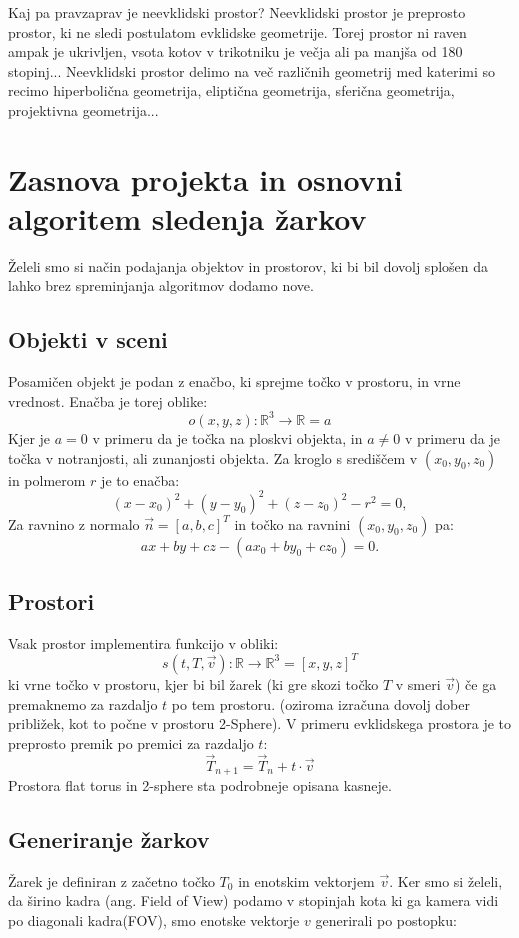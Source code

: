 \documentclass[titlepage]{article}
\begin{document}
Kaj pa pravzaprav je neevklidski prostor?
Neevklidski prostor je preprosto prostor, ki ne sledi postulatom evklidske geometrije. 
Torej prostor ni raven ampak je ukrivljen, vsota kotov v trikotniku je večja ali pa manjša od 
180 stopinj... Neevklidski prostor delimo na več različnih geometrij med katerimi so recimo 
hiperbolična geometrija, eliptična geometrija, sferična geometrija, projektivna geometrija...

\section{Zasnova projekta in osnovni algoritem sledenja žarkov}
Želeli smo si način podajanja objektov in prostorov, ki bi bil dovolj splošen da lahko brez
spreminjanja algoritmov dodamo nove.

\subsection{Objekti v sceni}
Posamičen objekt je podan z enačbo, ki sprejme točko v prostoru, in vrne vrednost. 
Enačba je torej oblike:
\[ o(x,y,z): \mathbb{R}^3 \to \mathbb{R} = a \]
Kjer je \(a = 0\) v primeru da je točka na ploskvi objekta, in \( a \neq 0 \) v primeru da 
je točka v notranjosti, ali zunanjosti objekta.
Za kroglo s središčem v $(x_{0}, y_{0}, z_{0})$ in polmerom $r$ je to enačba:
\[(x-x_{0})^{2}+(y-y_{0})^{2}+(z-z_{0})^{2}-r^{2}=0, \]
Za ravnino z normalo \( \vec{n} = [a, b, c]^T \) in točko na ravnini $(x_{0}, y_{0}, z_{0})$ pa:
\[ ax+by+cz-(ax_0+by_0+cz_0) = 0. \]

\subsection{Prostori}
Vsak prostor implementira funkcijo v obliki:
\[ s(t, T, \vec{v}): \mathbb{R} \to \mathbb{R}^3 = [x, y, z]^T \]
ki vrne točko v prostoru, kjer bi bil žarek (ki gre skozi točko \(T\) v smeri \(\vec{v}\)) če 
ga premaknemo za razdaljo \(t\) po tem prostoru. (oziroma izračuna dovolj dober približek, kot 
to počne v prostoru 2-Sphere). V primeru evklidskega prostora je to preprosto premik po premici 
za razdaljo \(t\):
\[ \vec{T}_{n+1} = \vec{T}_{n} + t \cdot \vec{v} \]
\bigskip
Prostora flat torus in 2-sphere sta podrobneje opisana kasneje.

\subsection{Generiranje žarkov}
Žarek je definiran z začetno točko \(T_{0}\) in enotskim vektorjem \(\vec{v}\). Ker smo si želeli, da 
širino kadra (ang. Field of View) podamo v stopinjah kota ki ga kamera vidi po diagonali kadra(FOV),
smo enotske vektorje \( v \) generirali po postopku:
\end{document}
